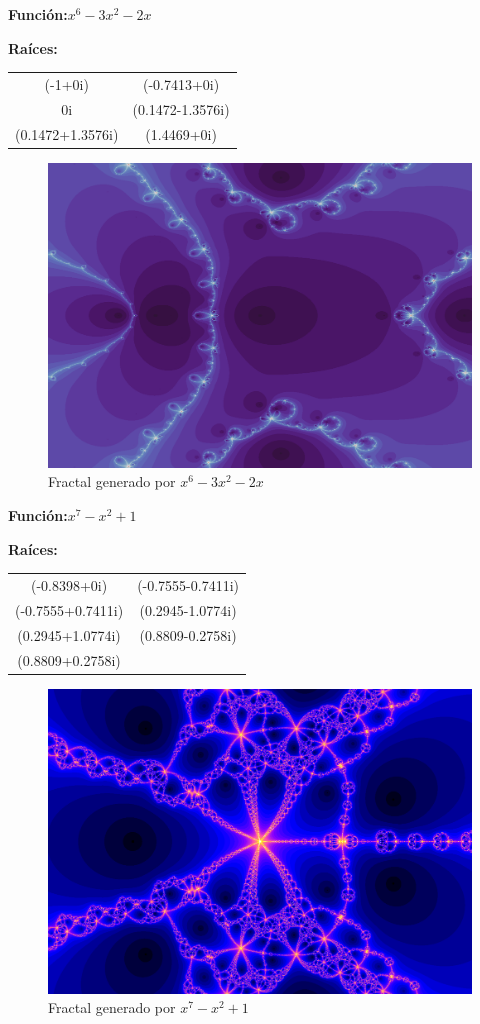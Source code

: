 \textbf{Función:}$x^6-3x^2-2x$

\textbf{Raíces:}

\begin{center}
\begin{tabular}{ c c  }
    (-1+0i) & (-0.7413+0i) \\ 
    0i & (0.1472-1.3576i) \\ 
    (0.1472+1.3576i) & (1.4469+0i)
 
\end{tabular}
\end{center}

\begin{figure}[H]
    \centering
    \includegraphics[scale=0.26]{images/ej4.png}
    \caption{Fractal generado por $x^6-3x^2-2x$}
    \label{fig:ej_4}
\end{figure}

\textbf{Función:}$x^7-x^2+1$

\textbf{Raíces:}

\begin{center}
\begin{tabular}{ c c  }
 (-0.8398+0i) & (-0.7555-0.7411i) \\ 
 (-0.7555+0.7411i) & (0.2945-1.0774i) \\ 
 (0.2945+1.0774i) & (0.8809-0.2758i) \\
 (0.8809+0.2758i)
\end{tabular}
\end{center}

\begin{figure}[H]
    \centering
    \includegraphics[scale=0.26]{images/ej5.png}
    \caption{Fractal generado por $x^7-x^2+1$}
    \label{fig:ej_5}
\end{figure}

